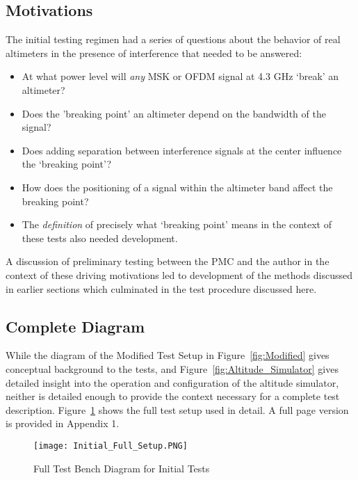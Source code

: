 \subsection{Motivations}
The initial testing regimen had a series of questions about the behavior of real altimeters in the presence of interference that needed to be answered: 

\begin{itemize}
\item At what power level will \textit{any} MSK or OFDM signal at 4.3 GHz `break' an altimeter?
\item Does the 'breaking point' an altimeter depend on the bandwidth of the signal?
\item Does adding separation between interference signals at the center influence the `breaking point'? 
\item How does the positioning of a signal within the altimeter band affect the breaking point?
\item The \textit{definition} of precisely what `breaking point' means in the context of these tests also needed development.  
\end{itemize}

A discussion of preliminary testing between the PMC and the author in the context of these driving motivations led to development of the methods discussed in earlier sections which culminated in the test procedure discussed here.  

\subsection{Complete Diagram}
While the diagram of the Modified Test Setup in Figure~\ref{fig:Modified} gives conceptual background to the tests, and Figure~\ref{fig:Altitude_Simulator} gives detailed insight into the operation and configuration of the altitude simulator, neither is detailed enough to provide the context necessary for a complete test description. Figure~\ref{fig:Initial} shows the full test setup used in detail. A full page version is provided in Appendix 1. 




\begin{figure}[ht]
\centering
\texttt{[image: Initial\_Full\_Setup.PNG]}
\caption{Full Test Bench Diagram for Initial Tests}

\label{fig:Initial}

\end{figure}


